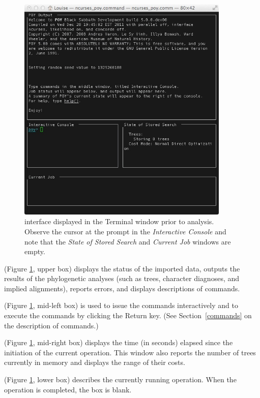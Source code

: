{\begin{figure}[htbp]
\centering
\includegraphics[width=0.9\textwidth]{doc/figures/figinterface.jpg}
\caption{\poy interface displayed in the Terminal window prior to analysis. Observe the cursor at the \poy prompt 
in the \emph{Interactive Console} and note that the \emph{State of Stored Search} and \emph{Current Job} windows are empty.}
\label{fig:figinterface}
\end{figure}

\begin{description}
\setlength{\labelsep}{5pt}
\setlength{\itemindent}{0pt}%
\item[POY Output] (Figure \ref{fig:figinterface}, upper box) displays the status of the imported data, outputs the results 
of the phylogenetic analyses (such as trees, character diagnoses, and implied alignments), reports errors, and displays 
descriptions of \poy commands.
\item[Interactive Console] (Figure \ref{fig:figinterface}, mid-left box) is used to issue the commands interactively and to 
execute the commands by clicking the Return key. (See Section~\ref{commands} on the description of \poy commands.)
\item[State of Stored Search] (Figure \ref{fig:figinterface}, mid-right box) displays the time (in seconds) elapsed since 
the initiation of the current operation. This window also reports the number of trees currently in memory and displays 
the range of their costs.
\item[Current Job] (Figure \ref{fig:figinterface}, lower box) describes the currently running operation. When the operation 
is completed, the box is blank.
\end{description} 

}
